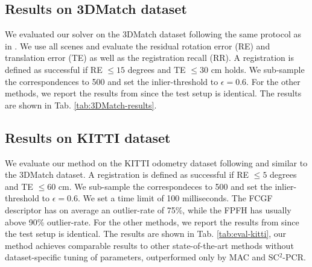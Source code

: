 \subsection{Results on 3DMatch dataset}

We evaluated our solver on the 3DMatch dataset \cite{zeng20163dmatch} 
following the same protocol as in \cite{SC2-PCR-Chen-2022-CVPR, zhang20233d}. We use all scenes and evaluate the residual rotation error (RE) and translation error (TE) as well as the registration recall (RR). A registration is defined as successful if RE $\leq 15$ degrees and TE $\leq 30$ cm holds. We sub-sample the correspondences to 500 and set the inlier-threshold to $\epsilon = 0.6$. For the other methods, we report the results from \cite{zhang20233d} since the test setup is identical. The results are shown in Tab. \ref{tab:3DMatch-results}.

\subsection{Results on KITTI dataset}


We evaluate our method on the KITTI odometry dataset \cite{Kitti-Geiger2013IJRR} following \cite{SC2-PCR-Chen-2022-CVPR, zhang20233d} and similar to the 3DMatch dataset. A registration is defined as successful if RE $\leq 5$ degrees and TE $\leq 60$ cm.
We sub-sample the correspondeces to 500 and set the inlier-threshold to $\epsilon = 0.6$. We set a time limit of 100 milliseconds. The FCGF \cite{9009829} descriptor has on average an outlier-rate of 75\%, while the FPFH has usually above 90\% outlier-rate. For the other methods, we report the results from \cite{zhang20233d} since the test setup is identical. The results are shown in Tab. \ref{tab:eval-kitti}, our method achieves comparable results to other state-of-the-art methods without dataset-specific tuning of parameters, outperformed only by MAC and SC$^2$-PCR.


